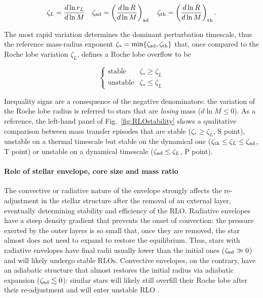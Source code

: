 \documentclass[a4paper,titlepage]{book}     	%
\begin{document}
\begin{equation}\label{eq:zetaRLO}
\zeta_L = \frac{d \ln r_L}{d \ln M} \quad \zeta_\textup{ad} = \left(\frac{d \ln R}{d \ln M}\right)_\textup{ad} \quad \zeta_\textup{th} = \left(\frac{d \ln R}{d \ln M}\right)_\textup{th}.
\end{equation}

The most rapid variation determines the dominant perturbation timescale, thus the reference mass-radius exponent $\zeta_* = \min\{\zeta_\textup{ad},\zeta_\textup{th}\}$ that, once compared to the Roche lobe variation $\zeta_L$, defines a Roche lobe overflow to be

\begin{equation}
\begin{cases}
\text{stable} &  \zeta_* \geq \zeta_L \\
\text{unstable} &  \zeta_* \leq \zeta_L
\end{cases}
\end{equation}

Inequality signs are a consequence of the negative denominators: the variation of the Roche lobe radius is referred to stars that are \emph{losing} mass ($d \ln M \leq 0$). As a reference, the left-hand panel of Fig.\ \ref{fig:RLOstability} shows a qualitative comparison between mass transfer episodes that are stable ($\zeta_* \geq \zeta_L$, S point), unstable on a thermal timescale but stable on the dynamical one ($\zeta_\textup{th} \leq \zeta_L \leq \zeta_\textup{ad}$, T point) or unstable on a dynamical timescale ($\zeta_\textup{ad} \leq \zeta_L$, P point).

\paragraph{Role of stellar envelope, core size and mass ratio} The convective or radiative nature of the envelope strongly affects the re-adjustment in the stellar structure after the removal of an external layer, eventually determining stability and efficiency of the RLO. Radiative envelopes have a steep density gradient that prevents the onset of convection: the pressure exerted by the outer layers is so small that, once they are removed, the star almost does not need to expand to restore the equilibrium. Thus, stars with radiative envelopes have final radii usually lower than the initial ones ($\zeta_{\rm {ad}} \gg 0$) and will likely undergo stable RLOs. Convective envelopes, on the contrary, have an adiabatic structure that almost restores the initial radius via adiabatic expansion ($\zeta_{\rm {ad}} \lesssim 0$): similar stars will likely still overfill their Roche lobe after their re-adjustment and will enter unstable RLO \cite{binaries} .\\
\end{document}
